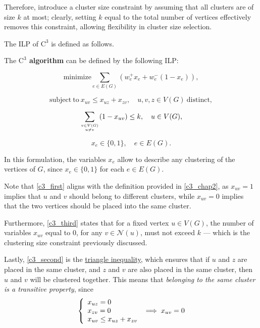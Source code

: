 Therefore, \textcite{c3} introduce a cluster size constraint by assuming that all clusters are of size $k$ at most; clearly, setting $k$ equal to the total number of vertices effectively removes this constraint, allowing flexibility in cluster size selection.

The ILP of $\mathrm{C}^3$ is defined as follows.

\begin{definition} \label{c3_ilp}
    The \textbf{$\mathrm{C}^3$ algorithm} can be defined by the following ILP:

    \begin{equation} \label{c3_first}
        \mathrm{minimize} \sum_{e \in E(G)} (w_e^+x_e + w_e^-(1 - x_e)),
    \end{equation}

    \begin{equation} \label{c3_second}
        \mathrm{subject \ to \ } x_{uv} \le x_{uz} + x_{zv}, \quad u, v, z \in V(G) \mathrm{\ distinct},
    \end{equation}

    \begin{equation} \label{c3_third}
        \sum_{v \in V(G) \atop u \neq v} (1 - x_{uv}) \le k, \quad u \in V(G),
    \end{equation}

    \begin{equation} \label{c3_fourth}
        x_e \in \{0, 1\}, \quad e \in E(G).
    \end{equation}
\end{definition}

In this formulation, the variables $x_e$ allow to describe any clustering of the vertices of $G$, since $x_e \in \{0, 1\}$ for each $e \in E(G)$.

Note that \cref{c3_first} aligns with the definition provided in \cref{c3_chap2}, as $x_{uv} = 1$ implies that $u$ and $v$ should belong to different clusters, while $x_{uv} = 0$ implies that the two vertices should be placed into the same cluster.

Furthermore, \cref{c3_third} states that for a fixed vertex $u \in V(G)$, the number of variables $x_{uv}$ equal to 0, for any $v \in \mathcal N(u)$, must not exceed $k$ --- which is the clustering size constraint previously discussed.

Lastly, \cref{c3_second} is the \href{https://en.wikipedia.org/wiki/Triangle_inequality}{triangle inequality}, which ensures that if $u$ and $z$ are placed in the same cluster, and $z$ and $v$ are also placed in the same cluster, then $u$ and $v$ will be clustered together. This means that \textit{belonging to the same cluster is a transitive property}, since $$\soe{l}{x_{uz} = 0 \\ x_{zv} = 0 \\ x_{uv} \le x_{uz} + x_{zv}} \implies x_{uv} = 0$$

